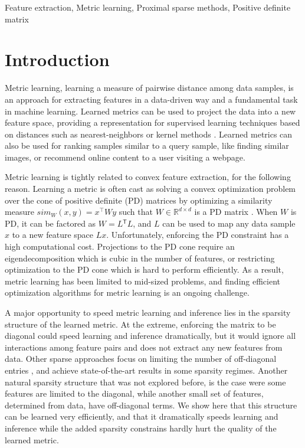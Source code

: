 \documentclass[twoside,11pt]{article}
\newcommand\mat[1]{{#1}}
\newcommand{\T}{{}^\mathsf{T}}
\newcommand{\W}{\mat{W}}
\newcommand{\R}{\mathbb{R}}
\newcommand{\cholL}{\mat{L}}
\begin{document}
\begin{keywords}
  Feature extraction, Metric learning, Proximal sparse methods, Positive definite matrix 
\end{keywords}

\section{Introduction}
\vskip -5pt
Metric learning, learning a measure of pairwise distance among data samples, is an approach for extracting features in a data-driven way and a fundamental task in machine learning. Learned metrics can be used to project the data into a new feature space, providing a representation for supervised learning techniques based on distances such as nearest-neighbors or kernel methods \citep{kulis2012survey}.
Learned metrics can also be used for ranking samples similar to a query sample, like finding similar images, or recommend online content to a user visiting a webpage. 

Metric learning is tightly related to convex feature extraction, for the following reason. Learning a metric is often cast as solving a convex optimization problem over the cone of positive definite (PD) matrices by optimizing a similarity measure $sim_W (x,y) = x^\top W y$ such that $W \in \R^{d \times d}$ is a PD matrix  \citep{kulis2012survey,bellet2013survey}. 
When $\W$ is PD, it can be factored as $\W= \cholL\T \cholL$, and $\cholL$ can be used to map any data sample $x$ to a new feature space $\cholL x$. Unfortunately, enforcing the PD constraint has a high computational cost. Projections to the PD cone require an eigendecomposition which is cubic in the number of features, or restricting optimization to the PD cone which is hard to perform efficiently. As a result, metric learning has been limited to mid-sized problems, and finding efficient optimization algorithms for metric learning is an ongoing challenge. 

A major opportunity to speed metric learning and inference lies in the sparsity structure of the learned metric. At the extreme, enforcing the matrix to be diagonal could speed learning and inference dramatically, but it would ignore all interactions among feature pairs and does not extract any new features from data. Other sparse approaches focus on limiting the number of off-diagonal entries \citep{HDSL}, and achieve state-of-the-art results in some sparsity regimes. Another natural sparsity structure that was not explored before, is the case were some features are limited to the diagonal, while another small set of features, determined from data, have off-diagonal terms. We show here that this structure can be learned very efficiently, and that it dramatically speeds learning and inference while the added sparsity constrains hardly hurt the quality of the learned metric.
\end{document}
